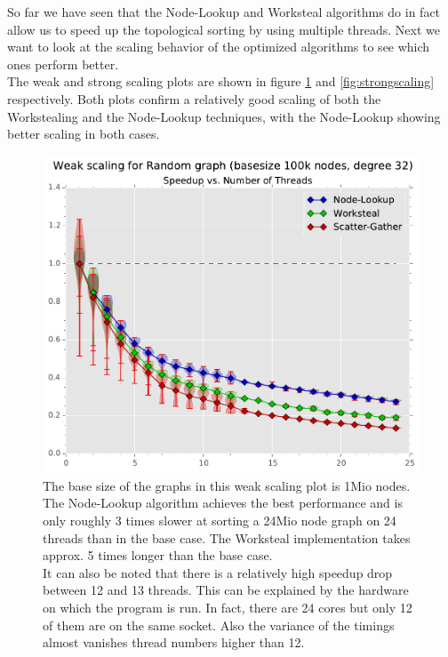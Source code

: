 So far we have seen that the Node-Lookup and Worksteal algorithms do in fact allow us to speed up the topological sorting by using multiple threads.
Next we want to look at the scaling behavior of the optimized algorithms to see which ones perform better. \\
The weak and strong scaling plots are shown in figure \ref{fig:weakscaling} and \ref{fig:strongscaling} respectively. Both plots confirm a relatively good scaling of both the Workstealing and the Node-Lookup techniques, with the Node-Lookup showing better scaling in both cases. \\
%
\begin{figure}[ht]
	\centering
	\includegraphics[width=\columnwidth]{plots/weakscaling_gtRANDOMLIN32_n1000000_deg32.pdf}
	\caption{The base size of the graphs in this weak scaling plot is 1Mio nodes.
		The Node-Lookup algorithm achieves the best performance and is only roughly 3 times slower at sorting a 24Mio node graph on 24 threads than in the base case. The Worksteal implementation takes approx. 5 times longer than the base case. \\
	It can also be noted that there is a relatively high speedup drop between 12 and 13 threads.
	This can be explained by the hardware on which the program is run. In fact, there are 24 cores but only 12 of them are on the same socket.
	Also the variance of the timings almost vanishes thread numbers higher than 12.
}
	\label{fig:weakscaling}
\end{figure}
